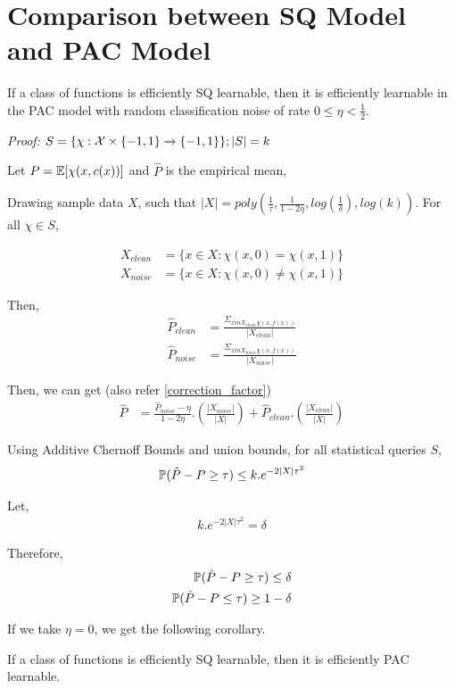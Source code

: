 \section{Comparison between SQ Model and PAC Model}
\label{sec:comparison}

\begin{theorem}
If a class of functions is efficiently SQ learnable, then it is efficiently learnable in the PAC model with random classification noise of rate $0 \leq \eta < \frac{1}{2}$.
\end{theorem}

\textit{Proof:} $S = \{\chi: \mathcal{X} \times \{-1, 1\} \xrightarrow{} \{-1, 1\}\}; |S| = k$

Let $P = \mathbb E[\chi(x, c(x))]$ and $\hat{P}$ is the empirical mean,

Drawing sample data $X$, such that $|X| = poly\left(\frac{1}{\tau}, \frac{1}{1-2\eta}, log(\frac{1}{\delta}), log(k)\right)$. For all $\chi \in S$,

\begin{align*}
    X_{clean} &= \{x \in X: \chi(x, 0) = \chi(x, 1)\} \\
    X_{noise} &= \{x \in X: \chi(x, 0) \neq \chi(x, 1)\}
\end{align*}

Then,
\begin{align*}
    \hat{P}_{clean} &= \frac{\Sigma_{x in X_{clean} \chi(x, f(x))}}{|X_{clean}|} \\
    \hat{P}_{noise} &= \frac{\Sigma_{x in X_{noise} \chi(x, f(x))}}{|X_{noise}|}
\end{align*}

Then, we can get (also refer \ref{correction_factor})
\begin{align*}
    \hat{P} &= \frac{\hat{P}_{noise} - \eta}{1 - 2\eta}.\left(\frac{|X_{noise}|}{|X|}\right) + \hat{P}_{clean}.\left(\frac{|X_{clean}|}{|X|}\right)
\end{align*}

Using Additive Chernoff Bounds and union bounds, for all statistical queries $S$,
\begin{align*}
    \mathbb{P}( \hat{P} - P \geq \tau ) \leq k.e^{-2|X|\tau^2}
\end{align*}

Let,
\begin{align*}
    k.e^{-2|X|\tau^2} = \delta
\end{align*}

Therefore,
\begin{align*}
    \mathbb{P}( \hat{P} - P \geq \tau ) \leq \delta \\
    \mathbb{P}( \hat{P} - P \leq \tau ) \geq 1-\delta
\end{align*}


If we take $\eta = 0$, we get the following corollary.

\begin{corollary}
If a class of functions is efficiently SQ learnable, then it is efficiently PAC learnable.
\end{corollary}
